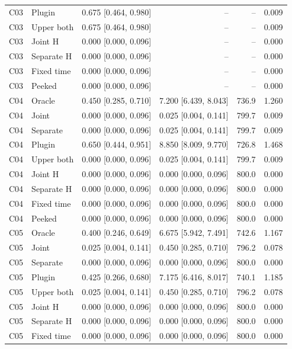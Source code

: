 \begin{longtable}{llrrrr}
C03 & Plugin & 0.675 [0.464, 0.980] & -- & -- & 0.009\\
C03 & Upper both & 0.675 [0.464, 0.980] & -- & -- & 0.009\\
C03 & Joint H & 0.000 [0.000, 0.096] & -- & -- & 0.000\\
C03 & Separate H & 0.000 [0.000, 0.096] & -- & -- & 0.000\\
C03 & Fixed time & 0.000 [0.000, 0.096] & -- & -- & 0.000\\
C03 & Peeked & 0.000 [0.000, 0.096] & -- & -- & 0.000\\
C04 & Oracle & 0.450 [0.285, 0.710] & 7.200 [6.439, 8.043] & 736.9 & 1.260\\
C04 & Joint & 0.000 [0.000, 0.096] & 0.025 [0.004, 0.141] & 799.7 & 0.009\\
C04 & Separate & 0.000 [0.000, 0.096] & 0.025 [0.004, 0.141] & 799.7 & 0.009\\
C04 & Plugin & 0.650 [0.444, 0.951] & 8.850 [8.009, 9.770] & 726.8 & 1.468\\
C04 & Upper both & 0.000 [0.000, 0.096] & 0.025 [0.004, 0.141] & 799.7 & 0.009\\
C04 & Joint H & 0.000 [0.000, 0.096] & 0.000 [0.000, 0.096] & 800.0 & 0.000\\
C04 & Separate H & 0.000 [0.000, 0.096] & 0.000 [0.000, 0.096] & 800.0 & 0.000\\
C04 & Fixed time & 0.000 [0.000, 0.096] & 0.000 [0.000, 0.096] & 800.0 & 0.000\\
C04 & Peeked & 0.000 [0.000, 0.096] & 0.000 [0.000, 0.096] & 800.0 & 0.000\\
C05 & Oracle & 0.400 [0.246, 0.649] & 6.675 [5.942, 7.491] & 742.6 & 1.167\\
C05 & Joint & 0.025 [0.004, 0.141] & 0.450 [0.285, 0.710] & 796.2 & 0.078\\
C05 & Separate & 0.000 [0.000, 0.096] & 0.000 [0.000, 0.096] & 800.0 & 0.000\\
C05 & Plugin & 0.425 [0.266, 0.680] & 7.175 [6.416, 8.017] & 740.1 & 1.185\\
C05 & Upper both & 0.025 [0.004, 0.141] & 0.450 [0.285, 0.710] & 796.2 & 0.078\\
C05 & Joint H & 0.000 [0.000, 0.096] & 0.000 [0.000, 0.096] & 800.0 & 0.000\\
C05 & Separate H & 0.000 [0.000, 0.096] & 0.000 [0.000, 0.096] & 800.0 & 0.000\\
C05 & Fixed time & 0.000 [0.000, 0.096] & 0.000 [0.000, 0.096] & 800.0 & 0.000\\

\end{longtable}
